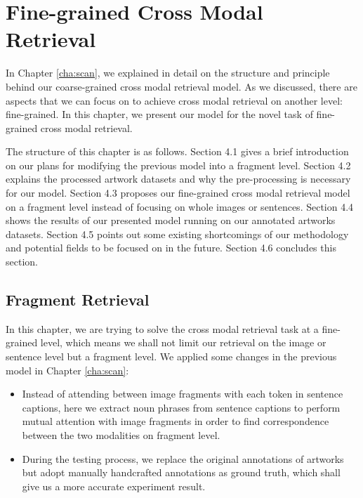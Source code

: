 \chapter{Fine-grained Cross Modal Retrieval}
\label{cha:Method}

In Chapter \ref{cha:scan}, we explained in detail on the structure and principle behind our coarse-grained cross modal retrieval model. As we discussed, there are aspects that we can focus on to
achieve cross modal retrieval on another level: fine-grained. In this chapter, we present our model for the novel task of fine-grained cross modal retrieval.

The structure of this chapter is as follows. Section 4.1 gives a brief introduction on our plans for modifying the previous model into a fragment level. Section 4.2 explains the processed artwork datasets and why the pre-processing is necessary for our model. Section 4.3 proposes our fine-grained cross modal retrieval model on a fragment level instead of focusing on whole images or sentences. Section 4.4 shows the results of our presented model running on our annotated artworks datasets. Section 4.5 points out some existing shortcomings of our methodology and potential fields to be focused on in the future. Section 4.6 concludes this section.


\section{Fragment Retrieval}
In this chapter, we are trying to solve the cross modal retrieval task at a fine-grained level, which means we shall not limit our retrieval on the image or sentence level but a fragment level. We applied some changes in the previous model in Chapter \ref{cha:scan}:

\begin{itemize}
    \item Instead of attending between image fragments with each token in sentence captions, here we extract noun phrases from sentence captions to perform mutual attention with image fragments in order to find correspondence between the two modalities on fragment level. 
    \item During the testing process, we replace the original annotations of artworks but adopt manually handcrafted annotations as ground truth, which shall give us a more accurate experiment result.
\end{itemize}

